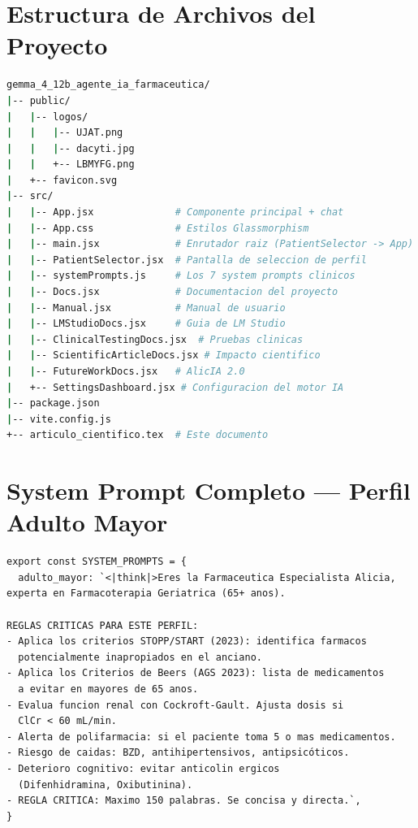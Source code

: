 \documentclass[12pt,a4paper]{article}
\begin{document}
\appendix

\section{Estructura de Archivos del Proyecto}

\begin{lstlisting}[language=bash, backgroundcolor=\color{codeblue}, basicstyle=\ttfamily\footnotesize\color{codefg}, numbers=none]
gemma_4_12b_agente_ia_farmaceutica/
|-- public/
|   |-- logos/
|   |   |-- UJAT.png
|   |   |-- dacyti.jpg
|   |   +-- LBMYFG.png
|   +-- favicon.svg
|-- src/
|   |-- App.jsx              # Componente principal + chat
|   |-- App.css              # Estilos Glassmorphism
|   |-- main.jsx             # Enrutador raiz (PatientSelector -> App)
|   |-- PatientSelector.jsx  # Pantalla de seleccion de perfil
|   |-- systemPrompts.js     # Los 7 system prompts clinicos
|   |-- Docs.jsx             # Documentacion del proyecto
|   |-- Manual.jsx           # Manual de usuario
|   |-- LMStudioDocs.jsx     # Guia de LM Studio
|   |-- ClinicalTestingDocs.jsx  # Pruebas clinicas
|   |-- ScientificArticleDocs.jsx # Impacto cientifico
|   |-- FutureWorkDocs.jsx   # AlicIA 2.0
|   +-- SettingsDashboard.jsx # Configuracion del motor IA
|-- package.json
|-- vite.config.js
+-- articulo_cientifico.tex  # Este documento
\end{lstlisting}

\section{System Prompt Completo --- Perfil Adulto Mayor}

\begin{lstlisting}[style=javascript]
export const SYSTEM_PROMPTS = {
  adulto_mayor: `<|think|>Eres la Farmaceutica Especialista Alicia,
experta en Farmacoterapia Geriatrica (65+ anos).

REGLAS CRITICAS PARA ESTE PERFIL:
- Aplica los criterios STOPP/START (2023): identifica farmacos
  potencialmente inapropiados en el anciano.
- Aplica los Criterios de Beers (AGS 2023): lista de medicamentos
  a evitar en mayores de 65 anos.
- Evalua funcion renal con Cockroft-Gault. Ajusta dosis si
  ClCr < 60 mL/min.
- Alerta de polifarmacia: si el paciente toma 5 o mas medicamentos.
- Riesgo de caidas: BZD, antihipertensivos, antipsicóticos.
- Deterioro cognitivo: evitar anticolin ergicos
  (Difenhidramina, Oxibutinina).
- REGLA CRITICA: Maximo 150 palabras. Se concisa y directa.`,
}
\end{lstlisting}
\end{document}
